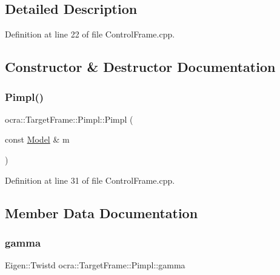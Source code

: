 \subsection{Detailed Description}


Definition at line 22 of file Control\+Frame.\+cpp.



\subsection{Constructor \& Destructor Documentation}
\hypertarget{structocra_1_1TargetFrame_1_1Pimpl_a01712cd9b98c68bfce55c2edab2cc846}{}\label{structocra_1_1TargetFrame_1_1Pimpl_a01712cd9b98c68bfce55c2edab2cc846} 
\subsubsection{\texorpdfstring{Pimpl()}{Pimpl()}}
{\footnotesize\ttfamily ocra\+::\+Target\+Frame\+::\+Pimpl\+::\+Pimpl (\begin{DoxyParamCaption}\item[{const \hyperlink{classocra_1_1Model}{Model} \&}]{m }\end{DoxyParamCaption})\hspace{0.3cm}{\ttfamily [inline]}}



Definition at line 31 of file Control\+Frame.\+cpp.



\subsection{Member Data Documentation}
\hypertarget{structocra_1_1TargetFrame_1_1Pimpl_a1c9e215a8979352974e88f7606a738b7}{}\label{structocra_1_1TargetFrame_1_1Pimpl_a1c9e215a8979352974e88f7606a738b7} 
\subsubsection{\texorpdfstring{gamma}{gamma}}
{\footnotesize\ttfamily Eigen\+::\+Twistd ocra\+::\+Target\+Frame\+::\+Pimpl\+::gamma}



